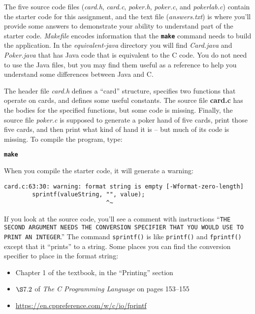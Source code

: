\begin{description}
\end{description}

The five source code files (\textit{card.h}, \textit{card.c}, \textit{poker.h}, \textit{poker.c}, and \textit{pokerlab.c}) contain the starter code for this assignment, and the text file (\textit{answers.txt}) is where you'll provide some answers to demonstrate your ability to understand part of the starter code.
\textit{Makefile} encodes information that the \textbf{\texttt{make}} command needs to build the application.
In the \mbox{\textit{equivalent-java}} directory you will find \textit{Card.java} and \textit{Poker.java} that has Java code that is equivalent to the C code.
You do not need to use the Java files, but you may find them useful as a reference to help you understand some differences between Java and C\@.

The header file \textit{card.h} defines a ``card'' structure, specifies two functions that operate on cards, and defines some useful constants.
The source file \textbf{card.c} has the bodies for the specified functions, but some code is missing.
Finally, the source file \textit{poker.c} is supposed to generate a poker hand of five cards, print those five cards, and then print what kind of hand it is -- but much of its code is missing.
To compile the program, type:

\textbf{\texttt{make}}

When you compile the starter code, it will generate a warning:

\begin{verbatim}
card.c:63:30: warning: format string is empty [-Wformat-zero-length]
        sprintf(valueString, "", value);
                             ^~
\end{verbatim}

\begin{description}
\end{description}
If you look at the source code, you'll see a comment with instructions ``\texttt{THE SECOND ARGUMENT NEEDS THE CONVERSION SPECIFIER THAT YOU WOULD USE TO PRINT AN INTEGER}.''
The command \lstinline{sprintf()} is like \lstinline{printf()} and \lstinline{fprintf()} except that it ``prints'' to a string.
Some places you can find the conversion specifier to place in the format string:
\begin{itemize}
    \item Chapter 1 of the textbook, in the ``Printing'' section
    \item $\S7.2$ of \textit{The C Programming Language} on pages 153--155
    \item \url{https://en.cppreference.com/w/c/io/fprintf}
\end{itemize}



